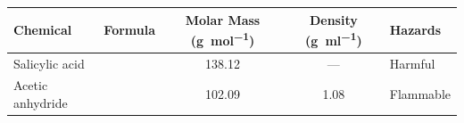 \documentclass[11pt,a4paper]{article}
\begin{document}
\begin{table}[h]
\centering
\begin{tabular}{l l S S l}
\toprule
Chemical & Formula & {Molar Mass (\unit{\gram\per\mole})} & {Density (\unit{\gram\per\milli\litre})} & Hazards \\
\midrule
Salicylic acid &  & 138.12 & {---} & Harmful \\
Acetic anhydride &  & 102.09 & 1.08 & Flammable \\
\bottomrule
\end{tabular}
\end{table}
\end{document}
